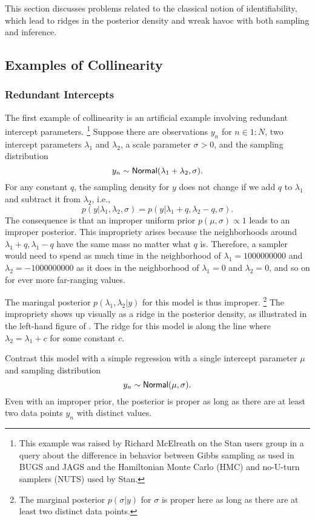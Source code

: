This section discusses problems related to the classical notion of
identifiability, which lead to ridges in the posterior density and
wreak havoc with both sampling and inference.

\subsection{Examples of Collinearity}

\subsubsection{Redundant Intercepts}

The first example of collinearity is an artificial example involving
redundant intercept parameters.%
%
\footnote{This example was raised by Richard McElreath on the Stan
  users group in a query about the difference in behavior between
  Gibbs sampling as used in BUGS and JAGS and the Hamiltonian Monte
  Carlo (HMC) and no-U-turn samplers (NUTS) used by Stan.}
%
Suppose there are observations $y_n$ for $n \in 1{:}N$, 
two intercept parameters $\lambda_1$ and
$\lambda_2$, a scale parameter $\sigma > 0$, and the sampling distribution
%
\[
y_n \sim \mbox{\sf Normal}(\lambda_1 + \lambda_2, \sigma).
\]
%
For any constant $q$, the sampling density for $y$ does not change if
we add $q$ to $\lambda_1$ and subtract it from $\lambda_2$, i.e.,
%
\[
p(y | \lambda_1, \lambda_2,\sigma)
=
p(y | \lambda_1 + q, \lambda_2 - q, \sigma).
\]
%
The consequence is that an improper uniform prior $p(\mu,\sigma)
\propto 1$ leads to an improper posterior.  This impropriety arises
because the neighborhoods around $\lambda_1 + q, \lambda_1 - q$ have
the same mass no matter what $q$ is.  Therefore, a sampler would need
to spend as much time in the neighborhood of $\lambda_1=1000000000$
and $\lambda_2=-1000000000$ as it does in the neighborhood of
$\lambda_1=0$ and $\lambda_2=0$, and so on for ever more far-ranging
values.

The maringal posterior $p(\lambda_1,\lambda_2|y)$ for this model is
thus improper.%
%
\footnote{The marginal posterior $p(\sigma|y)$ for $\sigma$ is proper
  here as long as there are at least two distinct data points.}
%
The impropriety shows up visually as a ridge in the posterior density,
as illustrated in the left-hand figure of
.  The ridge for this model is
along the line where $\lambda_2 = \lambda_1 + c$ for some constant
$c$.  

Contrast this model with a simple regression with a single intercept
parameter $\mu$ and sampling distribution
\[
y_n \sim \mbox{\sf Normal}(\mu,\sigma).
\]
Even with an improper prior, the posterior is proper as long as there
are at least two data points $y_n$ with distinct values.


